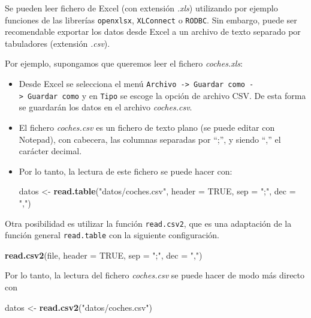 \documentclass[]{book}
\newenvironment{Shaded}{\begin{snugshade}}{\end{snugshade}}
\newcommand{\KeywordTok}[1]{\textcolor[rgb]{0.13,0.29,0.53}{\textbf{#1}}}
\newcommand{\DataTypeTok}[1]{\textcolor[rgb]{0.13,0.29,0.53}{#1}}
\newcommand{\StringTok}[1]{\textcolor[rgb]{0.31,0.60,0.02}{#1}}
\newcommand{\OtherTok}[1]{\textcolor[rgb]{0.56,0.35,0.01}{#1}}
\newcommand{\NormalTok}[1]{#1}
\begin{document}
Se pueden leer fichero de Excel (con extensión \emph{.xls}) utilizando
por ejemplo funciones de las librerías \texttt{openxlsx},
\texttt{XLConnect} o \texttt{RODBC}. Sin embargo, puede ser recomendable
exportar los datos desde Excel a un archivo de texto separado por
tabuladores (extensión \emph{.csv}).

Por ejemplo, supongamos que queremos leer el fichero \emph{coches.xls}:

\begin{itemize}
\item
  Desde Excel se selecciona el menú
  \texttt{Archivo\ -\textgreater{}\ Guardar\ como\ -\textgreater{}\ Guardar\ como}
  y en \texttt{Tipo} se escoge la opción de archivo CSV. De esta forma
  se guardarán los datos en el archivo \emph{coches.csv}.
\item
  El fichero \emph{coches.csv} es un fichero de texto plano (se puede
  editar con Notepad), con cabecera, las columnas separadas por ``;'', y
  siendo ``,'' el carácter decimal.
\item
  Por lo tanto, la lectura de este fichero se puede hacer con:

\begin{Shaded}
\begin{Highlighting}[]
\NormalTok{datos <-}\StringTok{ }\KeywordTok{read.table}\NormalTok{(}\StringTok{"datos/coches.csv"}\NormalTok{, }\DataTypeTok{header =} \OtherTok{TRUE}\NormalTok{, }\DataTypeTok{sep =} \StringTok{";"}\NormalTok{, }\DataTypeTok{dec =} \StringTok{","}\NormalTok{)}
\end{Highlighting}
\end{Shaded}
\end{itemize}

Otra posibilidad es utilizar la función \texttt{read.csv2}, que es una
adaptación de la función general \texttt{read.table} con la siguiente
configuración.

\begin{Shaded}
\begin{Highlighting}[]
\KeywordTok{read.csv2}\NormalTok{(file, }\DataTypeTok{header =} \OtherTok{TRUE}\NormalTok{, }\DataTypeTok{sep =} \StringTok{";"}\NormalTok{, }\DataTypeTok{dec =} \StringTok{","}\NormalTok{)}
\end{Highlighting}
\end{Shaded}

Por lo tanto, la lectura del fichero \emph{coches.csv} se puede hacer de
modo más directo con

\begin{Shaded}
\begin{Highlighting}[]
\NormalTok{datos <-}\StringTok{ }\KeywordTok{read.csv2}\NormalTok{(}\StringTok{"datos/coches.csv"}\NormalTok{)}
\end{Highlighting}
\end{Shaded}
\end{document}
